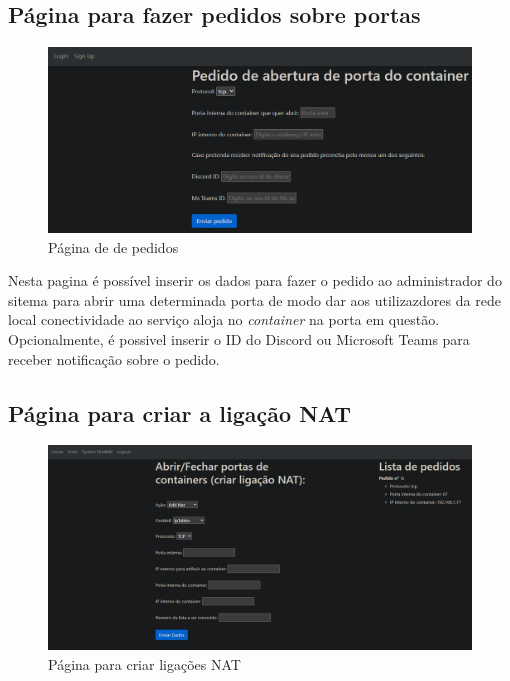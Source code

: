 \subsection{Página para fazer pedidos sobre portas}

\begin{figure}[H]
\begin{center}
\includegraphics[width=16cm]{figs/pedido3.png}
\caption{Página de de pedidos}
\label{fig:bookstack}
\end{center}
\end{figure}

Nesta pagina é possível inserir os dados para fazer o pedido ao administrador do
sitema para abrir uma determinada porta de modo dar aos utilizazdores da rede local
conectividade ao serviço aloja no \textit{container} na porta em questão. \\

Opcionalmente, é possivel inserir o ID do Discord ou Microsoft Teams para receber
notificação sobre o pedido.

\subsection{Página para criar a ligação NAT}

\begin{figure}[H]
\begin{center}
\includegraphics[width=16cm]{figs/criar nat 2.png}
\caption{Página para criar ligações NAT}
\label{fig:bookstack}
\end{center}
\end{figure}

